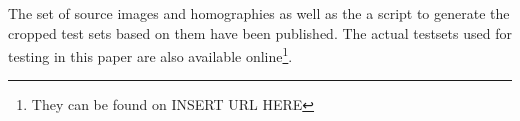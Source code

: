 \documentclass{article}
\begin{document}
The set of source images and homographies as well as the a script to 
generate the cropped test sets based on them have been published. The 
actual testsets used for testing in this paper are also available 
online\footnote{They can be found on INSERT URL HERE}.

\begin{figure}
\end{figure}
\end{document}

